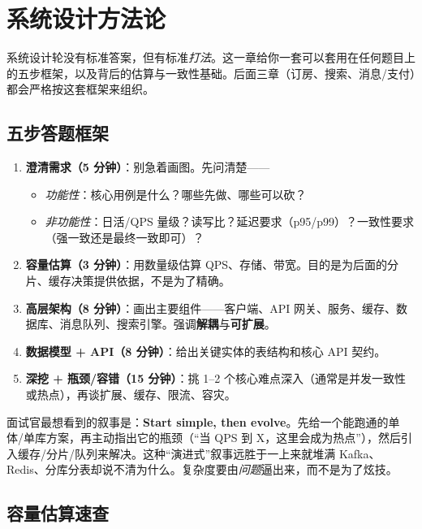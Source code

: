 \chapter{系统设计方法论}

系统设计轮没有标准答案，但有标准\emph{打法}。这一章给你一套可以套用在任何题目上的五步框架，以及背后的估算与一致性基础。后面三章（订房、搜索、消息/支付）都会严格按这套框架来组织。

\section{五步答题框架}

\begin{enumerate}
  \item \textbf{澄清需求（5 分钟）}：别急着画图。先问清楚——
  \begin{itemize}
    \item \emph{功能性}：核心用例是什么？哪些先做、哪些可以砍？
    \item \emph{非功能性}：日活/QPS 量级？读写比？延迟要求（p95/p99）？一致性要求（强一致还是最终一致即可）？
  \end{itemize}
  \item \textbf{容量估算（3 分钟）}：用数量级估算 QPS、存储、带宽。目的是为后面的分片、缓存决策提供依据，不是为了精确。
  \item \textbf{高层架构（8 分钟）}：画出主要组件——客户端、API 网关、服务、缓存、数据库、消息队列、搜索引擎。强调\textbf{解耦}与\textbf{可扩展}。
  \item \textbf{数据模型 + API（8 分钟）}：给出关键实体的表结构和核心 API 契约。
  \item \textbf{深挖 + 瓶颈/容错（15 分钟）}：挑 1--2 个核心难点深入（通常是并发一致性或热点），再谈扩展、缓存、限流、容灾。
\end{enumerate}

\begin{idea}
面试官最想看到的叙事是：\textbf{Start simple, then evolve}。先给一个能跑通的单体/单库方案，再主动指出它的瓶颈（“当 QPS 到 X，这里会成为热点”），然后引入缓存/分片/队列来解决。这种“演进式”叙事远胜于一上来就堆满 Kafka、Redis、分库分表却说不清为什么。复杂度要由\emph{问题}逼出来，而不是为了炫技。
\end{idea}

\section{容量估算速查}

